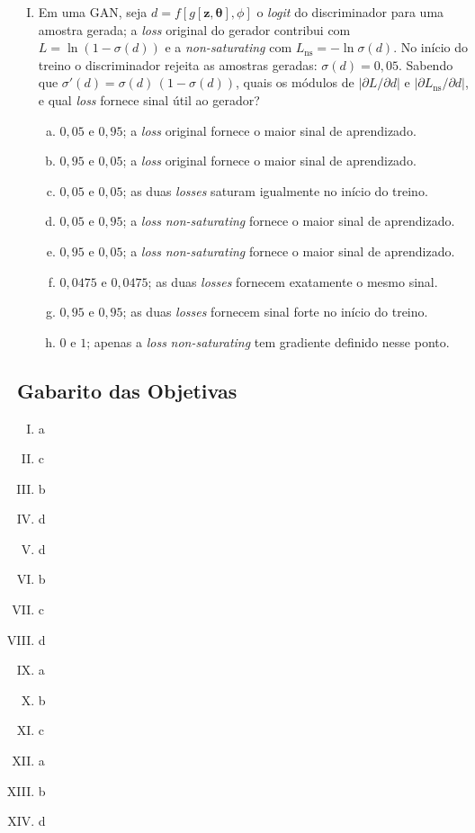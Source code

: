 \documentclass{dlproblemset}
\newcommand{\thetav}{\boldsymbol{\theta}}
\begin{document}
\begin{enumerate}[I)]
\item Em uma GAN, seja $d = f[g[\mathbf{z},\thetav],\phi]$ o \textit{logit} do discriminador para uma amostra gerada; a \textit{loss} original do gerador contribui com $L = \ln(1 - \sigma(d))$ e a \textit{non-saturating} com $L_{\text{ns}} = -\ln \sigma(d)$. No início do treino o discriminador rejeita as amostras geradas: $\sigma(d) = 0{,}05$. Sabendo que $\sigma'(d) = \sigma(d)\,(1 - \sigma(d))$, quais os módulos de $\left|\partial L / \partial d\right|$ e $\left|\partial L_{\text{ns}} / \partial d\right|$, e qual \textit{loss} fornece sinal útil ao gerador?
\begin{enumerate}[(a)]
    \item $0{,}05$ e $0{,}95$; a \textit{loss} original fornece o maior sinal de aprendizado.
    \item $0{,}95$ e $0{,}05$; a \textit{loss} original fornece o maior sinal de aprendizado.
    \item $0{,}05$ e $0{,}05$; as duas \textit{losses} saturam igualmente no início do treino.
    \item $0{,}05$ e $0{,}95$; a \textit{loss} \textit{non-saturating} fornece o maior sinal de aprendizado.
    \item $0{,}95$ e $0{,}05$; a \textit{loss} \textit{non-saturating} fornece o maior sinal de aprendizado.
    \item $0{,}0475$ e $0{,}0475$; as duas \textit{losses} fornecem exatamente o mesmo sinal.
    \item $0{,}95$ e $0{,}95$; as duas \textit{losses} fornecem sinal forte no início do treino.
    \item $0$ e $1$; apenas a \textit{loss} \textit{non-saturating} tem gradiente definido nesse ponto.
\end{enumerate}

\end{enumerate}

\subsection*{Gabarito das Objetivas}
\begin{enumerate}[I)]
    \item a
    \item c
    \item b
    \item d
    \item d
    \item b
    \item c
    \item d
    \item a
    \item b
    \item c
    \item a
    \item b
    \item d
\end{enumerate}
\end{document}

